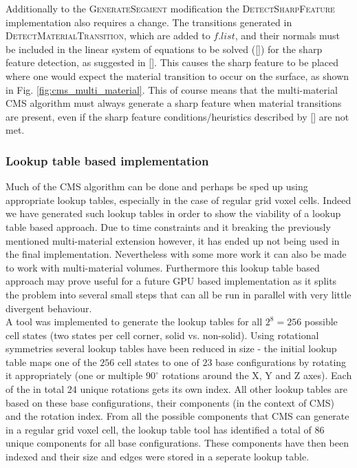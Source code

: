 Additionally to the \textsc{GenerateSegment} modification the \textsc{DetectSharpFeature} implementation also requires a change. The transitions generated in \textsc{DetectMaterialTransition}, which are added to
$f.list$, and their normals must be included in the linear system of equations to be solved ([]) for the sharp feature detection,
as suggested in []. This causes the sharp feature to be placed where one would expect the material transition to occur on the surface, as shown in Fig. \ref{fig:cms_multi_material}.
This of course means that the multi-material CMS algorithm must always generate a sharp feature when material transitions are present, even if the sharp feature conditions/heuristics described by [] are not met.

\subsubsection{Lookup table based implementation}

Much of the CMS algorithm can be done and perhaps be sped up using appropriate lookup tables, especially in the case of regular grid voxel cells. Indeed we have generated such lookup tables in order to show
the viability of a lookup table based approach. Due to time constraints and it breaking the previously mentioned multi-material extension however, it has ended up not being used in the final implementation.
Nevertheless with some more work it can also be made to work with multi-material volumes. Furthermore this lookup table based approach may prove useful for a future GPU based implementation as it splits
the problem into several small steps that can all be run in parallel with very little divergent behaviour.\\
A tool was implemented to generate the lookup tables for all $2^8 = 256$ possible cell states (two states per cell corner, solid vs. non-solid). Using rotational symmetries several lookup tables have been reduced in size - the initial lookup table maps one of the $256$ cell states to one of $23$ base configurations by rotating it appropriately (one or multiple $90^{\circ}$ rotations around the X, Y and Z axes). Each of the in total $24$ unique rotations gets its own index.
All other lookup tables are based on these base configurations, their components (in the context of CMS) and the rotation index.
From all the possible components that CMS can generate in a regular grid voxel cell, the lookup table tool has identified a total of $86$ unique components for all base configurations. These components have
then been indexed and their size and edges were stored in a seperate lookup table.\\

